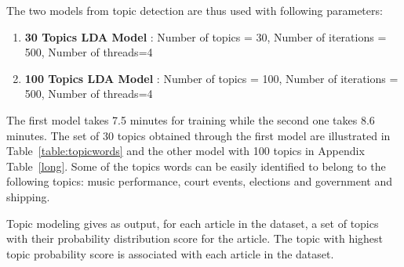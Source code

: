 The two models from topic detection are thus used with following parameters:
\begin{enumerate}
 \item \textbf{30 Topics LDA Model} : Number of topics = 30, Number of iterations = 500, Number of threads=4
 \item \textbf{100 Topics LDA Model} : Number of topics = 100, Number of iterations = 500, Number of threads=4
\end{enumerate}
The first model takes 7.5 minutes for training while the second one takes 8.6 minutes.
The set of 30 topics obtained through the first model are illustrated in Table~\ref{table:topicwords} and the other model with 100 topics in Appendix Table~\ref{long}. Some of the topics words can be easily identified to belong to  the following topics: music performance, court events, elections and government and shipping.

Topic modeling gives as output, for each article in the dataset, a set of topics with their probability distribution score for the article. The topic with highest topic probability score is associated with each article in the dataset. 


